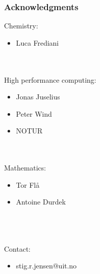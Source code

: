 \documentclass[mathserif, 10pt]{beamer}
\begin{document}
\begin{frame}
    \frametitle{Acknowledgments}
    Chemistry:
    \begin{itemize}
	\item Luca Frediani
    \end{itemize}
    \ \\
    \ \\
    High performance computing:
    \begin{itemize}
    	\item Jonas Juselius
    	\item Peter Wind
	\item NOTUR
    \end{itemize}
    \ \\
    \ \\
    Mathematics:
    \begin{itemize}
	\item Tor Fl\aa
	\item Antoine Durdek
    \end{itemize}
    \ \\
    \ \\
    \ \\
    Contact:
    \begin{itemize}
	\item stig.r.jensen@uit.no
    \end{itemize}
\end{frame}
\end{document}
